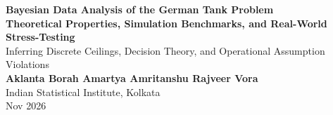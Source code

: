 \documentclass[aspectratio=169,10pt]{beamer}
\begin{document}
{
\begin{frame}[c,plain]
  \centering
  {\Large \textbf{\color{white} Bayesian Data Analysis of the German Tank Problem}}\\[0.22cm]
  {\large \textbf{\color{white} Theoretical Properties, Simulation Benchmarks, and Real-World Stress-Testing}}\\[0.18cm]
  {\small \color{accentcyan} Inferring Discrete Ceilings, Decision Theory, and Operational Assumption Violations}\\[0.65cm]
  
  {\normalsize \textbf{\color{white} Aklanta Borah \quad Amartya Amritanshu \quad Rajveer Vora}}\\[0.12cm]
  {\footnotesize \color{white!80} Indian Statistical Institute, Kolkata}\\[0.08cm]
  {\scriptsize \color{white!50} Nov 2026}
\end{frame}
}
\end{document}
